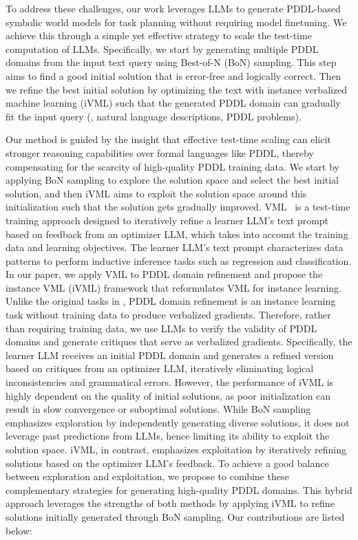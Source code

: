To address these challenges, our work leverages LLMs to generate PDDL-based symbolic world models for task planning without requiring model finetuning. We achieve this through a simple yet effective strategy to scale the test-time computation of LLMs. Specifically, we start by generating multiple PDDL domains from the input text query using Best-of-N (BoN) sampling. This step aims to find a good initial solution that is error-free and logically correct. Then we refine the best initial solution by optimizing the text with instance verbalized machine learning (iVML) such that the generated PDDL domain can gradually fit the input query (\eg, natural language descriptions, PDDL problems).

Our method is guided by the insight that effective test-time scaling can elicit stronger reasoning capabilities over formal languages like PDDL, thereby compensating for the scarcity of high-quality PDDL training data. We start by applying BoN sampling to explore the solution space and select the best initial solution, and then iVML aims to exploit the solution space around this initialization such that the solution gets gradually improved. VML~\cite{xiao2024verbalized} is a test-time training approach designed to iteratively refine a learner LLM's text prompt based on feedback from an optimizer LLM, which takes into account the training data and learning objectives. The learner LLM's text prompt characterizes data patterns to perform inductive inference tasks such as regression and classification. In our paper, we apply VML to PDDL domain refinement and propose the instance VML (iVML) framework that reformulates VML for instance learning. Unlike the original tasks in \cite{xiao2024verbalized}, PDDL domain refinement is an instance learning task without training data to produce verbalized gradients. Therefore, rather than requiring training data, we use LLMs to verify the validity of PDDL domains and generate critiques that serve as verbalized gradients. Specifically, the learner LLM receives an initial PDDL domain and generates a refined version based on critiques from an optimizer LLM, iteratively eliminating logical inconsistencies and grammatical errors.
However, the performance of iVML is highly dependent on the quality of initial solutions, as poor initialization can result in slow convergence or suboptimal solutions.
While BoN sampling emphasizes exploration by independently generating diverse solutions, it does not leverage past predictions from LLMs, hence limiting its ability to exploit the solution space.
iVML, in contrast, emphasizes exploitation by iteratively refining solutions based on the optimizer LLM's feedback. To achieve a good balance between exploration and exploitation, we propose to combine these complementary strategies for generating high-quality PDDL domains. This hybrid approach leverages the strengths of both methods by applying iVML to refine solutions initially generated through BoN sampling. Our contributions are listed below:


